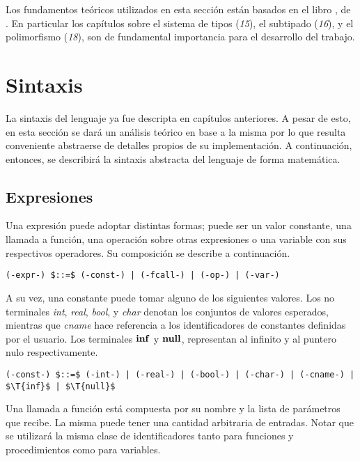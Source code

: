 \documentclass{article}
\begin{document}
Los fundamentos teóricos utilizados en esta sección están basados en el libro \Libro, de \Autor.
En particular los capítulos sobre el sistema de tipos (\textit{15}), el subtipado (\textit{16}), y el polimorfismo (\textit{18}), son de fundamental importancia para el desarrollo del trabajo.

\section{Sintaxis}

La sintaxis del lenguaje ya fue descripta en capítulos anteriores.
A pesar de esto, en esta sección se dará un análisis teórico en base a la misma por lo que resulta conveniente abstraerse de detalles propios de su implementación.
A continuación, entonces, se describirá la sintaxis abstracta del lenguaje de forma matemática.

\subsection{Expresiones}

Una expresión puede adoptar distintas formas; puede ser un valor constante, una llamada a función, una operación sobre otras expresiones o una variable con sus respectivos operadores.
Su composición se describe a continuación.

\begin{lstlisting}[style = syntax]
(-expr-) $::=$ (-const-) | (-fcall-) | (-op-) | (-var-)
\end{lstlisting}

A su vez, una constante puede tomar alguno de los siguientes valores.
Los no terminales \textit{int}, \textit{real}, \textit{bool}, y \textit{char} denotan los conjuntos de valores esperados, mientras que \textit{cname} hace referencia a los identificadores de constantes definidas por el usuario.
Los terminales $\mathbf{inf}$ y $\mathbf{null}$, representan al infinito y al puntero nulo respectivamente.

\begin{lstlisting}[style = syntax]
(-const-) $::=$ (-int-) | (-real-) | (-bool-) | (-char-) | (-cname-) | $\T{inf}$ | $\T{null}$
\end{lstlisting}

Una llamada a función está compuesta por su nombre y la lista de parámetros que recibe.
La misma puede tener una cantidad arbitraria de entradas.
Notar que se utilizará la misma clase de identificadores tanto para funciones y procedimientos como para variables.
\end{document}
